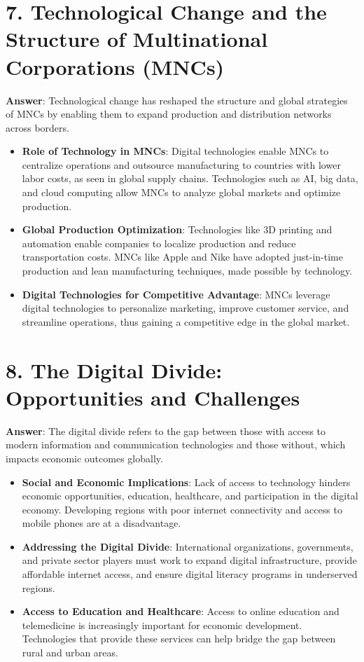 \documentclass{article}
\begin{document}
\section*{7. Technological Change and the Structure of Multinational Corporations (MNCs)}
\textbf{Answer}:  
Technological change has reshaped the structure and global strategies of MNCs by enabling them to expand production and distribution networks across borders.

\begin{itemize}
    \item \textbf{Role of Technology in MNCs}:  
    Digital technologies enable MNCs to centralize operations and outsource manufacturing to countries with lower labor costs, as seen in global supply chains. Technologies such as AI, big data, and cloud computing allow MNCs to analyze global markets and optimize production.
    
    \item \textbf{Global Production Optimization}:  
    Technologies like 3D printing and automation enable companies to localize production and reduce transportation costs. MNCs like Apple and Nike have adopted just-in-time production and lean manufacturing techniques, made possible by technology.
    
    \item \textbf{Digital Technologies for Competitive Advantage}:  
    MNCs leverage digital technologies to personalize marketing, improve customer service, and streamline operations, thus gaining a competitive edge in the global market.
\end{itemize}

\section*{8. The Digital Divide: Opportunities and Challenges}
\textbf{Answer}:  
The digital divide refers to the gap between those with access to modern information and communication technologies and those without, which impacts economic outcomes globally.

\begin{itemize}
    \item \textbf{Social and Economic Implications}:  
    Lack of access to technology hinders economic opportunities, education, healthcare, and participation in the digital economy. Developing regions with poor internet connectivity and access to mobile phones are at a disadvantage.
    
    \item \textbf{Addressing the Digital Divide}:  
    International organizations, governments, and private sector players must work to expand digital infrastructure, provide affordable internet access, and ensure digital literacy programs in underserved regions.
    
    \item \textbf{Access to Education and Healthcare}:  
    Access to online education and telemedicine is increasingly important for economic development. Technologies that provide these services can help bridge the gap between rural and urban areas.
\end{itemize}
\end{document}
